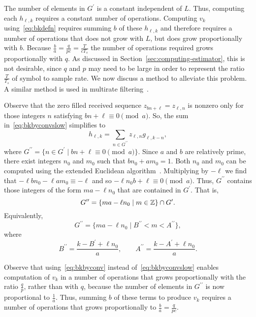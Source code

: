 \documentclass[journal]{IEEEtranTCOM}
\begin{document}
The number of elements in $G^\prime$ is a constant independent of $L$.  Thus, computing each $h_{\ell,k}$ requires a constant number of operations.  Computing $v_k$ using~\eqref{eq:bkdefn} requires summing $b$ of these $h_{\ell,k}$ and therefore requires a number of operations that does not grow with $L$, but does grow proportionally with $b$.  Because $\tfrac{b}{a} = \tfrac{q}{pc} = \tfrac{T}{cT_s}$ the number of operations required grows proportionally with $q$.  As discussed in Section~\ref{sec:computing-estimator}, this is not desirable, since $q$ and $p$ may need to be large in order to represent the ratio $\tfrac{T}{T_s}$ of symbol to sample rate.  We now discuss a method to alleviate this problem.  A similar method is used in multirate filtering~\cite{Vaidyanthan_multirate_polyphase_1993,Crochiere_polyphase_procieee_1981}.

Observe that the zero filled received sequence $z_{bn+\ell} = z_{\ell,n}$ is nonzero only for those integers $n$ satisfying $bn+\ell \equiv 0 \pmod a$.  So, the sum in~\eqref{eq:bkbyconvslow} simplifies to
\begin{equation}\label{eq:bkbyconv}
h_{\ell,k} = \sum_{n \in G^{\prime\prime}} z_{\ell,n}g_{\ell,k-n},
\end{equation}
where $G^{\prime\prime} = \{ n \in G^{\prime} \mid bn + \ell \equiv 0 \pmod a \}$.  Since $a$ and $b$ are relatively prime, there exist integers $n_0$ and $m_0$ such that $bn_0 + am_0 = 1$.  Both $n_0$ and $m_0$ can be computed using the extended Euclidean algorithm~\cite{Cormen2001}.  Multiplying by $-\ell$ we find that $-\ell b n_0 - \ell a m_0 \equiv - \ell$ and so $-\ell n_0 b + \ell \equiv 0 \pmod a$.  Thus, $G^{\prime\prime}$ contains those integers of the form $ma - \ell n_0$ that are contained in $G^\prime$.  That is,
\[
G^{\prime\prime} = \{ m a - \ell n_0 \mid m \in {\mathbb Z} \} \cap G^\prime.
\]
Equivalently,
\[
G^{\prime\prime} = \{ m a - \ell n_0 \mid B^{\prime\prime} < m < A^{\prime\prime}\},
\]
where 
\[
B^{\prime\prime} = \frac{k - B^\prime + \ell n_0}{a}, \qquad A^{\prime\prime} = \frac{k - A^\prime + \ell n_0}{a}.
\]

Observe that using~\eqref{eq:bkbyconv} instead of~\eqref{eq:bkbyconvslow} enables computation of $v_k$ in a number of operations that grows proportionally with the ratio $\frac{q}{p}$, rather than with $q$, because the number of elements in $G^{\prime\prime}$ is now proportional to $\frac{1}{a}$.  Thus, summing $b$ of these terms to produce $v_k$ requires a number of operations that grows proportionally to $\tfrac{b}{a} = \tfrac{q}{pc}$.
\end{document}

